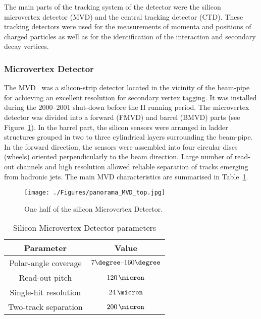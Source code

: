 The main parts of the tracking system of the \zeus detector were the silicon microvertex detector (MVD) and the central tracking detector (CTD). These tracking detectors were used for the measurements of momenta and positions of charged particles as well as for the identification of the interaction and secondary decay vertices.

\subsubsection{Microvertex Detector}
\label{subsubsec:mvd}
The MVD~\cite{nim:a581:656} was a silicon-strip detector located in the vicinity of the beam-pipe for achieving an excellent resolution for secondary vertex tagging. It was installed during the 2000--2001 shut-down before the \hera II running period. The microvertex detector was divided into a forward (FMVD) and barrel (BMVD) parts (see Figure~\ref{fig:MVD_artistic}). In the barrel part, the silicon sensors were arranged in ladder structures grouped in two to three cylindrical layers surrounding the beam-pipe. In the forward direction, the sensors were assembled into four circular discs (wheels) oriented perpendicularly to the beam direction. Large number of read-out channels and high resolution allowed reliable separation of tracks emerging from hadronic jets. The main MVD characteristics are summarised in Table~\ref{tab:mvdgeomparameters}. 

\begin{figure}[htbp]
	\centering
		\texttt{[image: ./Figures/panorama\_MVD\_top.jpg]}
	\caption{One half of the silicon Microvertex Detector.}
	\label{fig:MVD_artistic}
\end{figure}

\begin{table}[htbp]
	\centering
\begin{tabular}{ | c | c | }
     \hline
      Parameter & Value \\
			\hline
			\hline
			Polar-angle coverage & $7\degree \mbox{--} 160\degree$ \\ \hline
      Read-out pitch & $120\,\micron$  \\ \hline
			Single-hit resolution & $24\,\micron$ \\ \hline 
			Two-track separation & $200\,\micron$ \\
      \hline
     \end{tabular}
	\caption{Silicon Microvertex Detector parameters}
	\label{tab:mvdgeomparameters}
\end{table}


